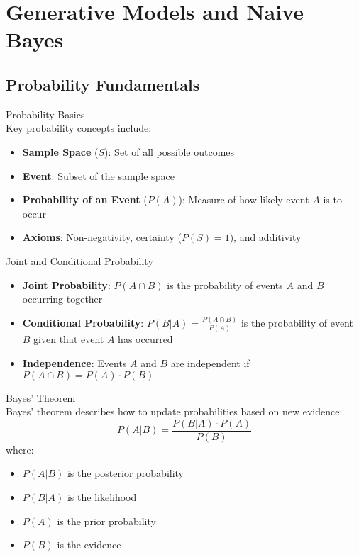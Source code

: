 \section{Generative Models and Naive Bayes}

\subsection{Probability Fundamentals}

\begin{definition}{Probability Basics}\\
Key probability concepts include:
\begin{itemize}
    \item \textbf{Sample Space} ($S$): Set of all possible outcomes
    \item \textbf{Event}: Subset of the sample space
    \item \textbf{Probability of an Event} ($P(A)$): Measure of how likely event $A$ is to occur
    \item \textbf{Axioms}: Non-negativity, certainty ($P(S) = 1$), and additivity
\end{itemize}
\end{definition}

\begin{definition}{Joint and Conditional Probability}\\
\begin{itemize}
    \item \textbf{Joint Probability}: $P(A \cap B)$ is the probability of events $A$ and $B$ occurring together
    \item \textbf{Conditional Probability}: $P(B|A) = \frac{P(A \cap B)}{P(A)}$ is the probability of event $B$ given that event $A$ has occurred
    \item \textbf{Independence}: Events $A$ and $B$ are independent if $P(A \cap B) = P(A) \cdot P(B)$
\end{itemize}
\end{definition}

\begin{definition}{Bayes' Theorem}\\
Bayes' theorem describes how to update probabilities based on new evidence:
\[P(A|B) = \frac{P(B|A) \cdot P(A)}{P(B)}\]
where:
\begin{itemize}
    \item $P(A|B)$ is the posterior probability
    \item $P(B|A)$ is the likelihood
    \item $P(A)$ is the prior probability
    \item $P(B)$ is the evidence
\end{itemize}
\end{definition}

